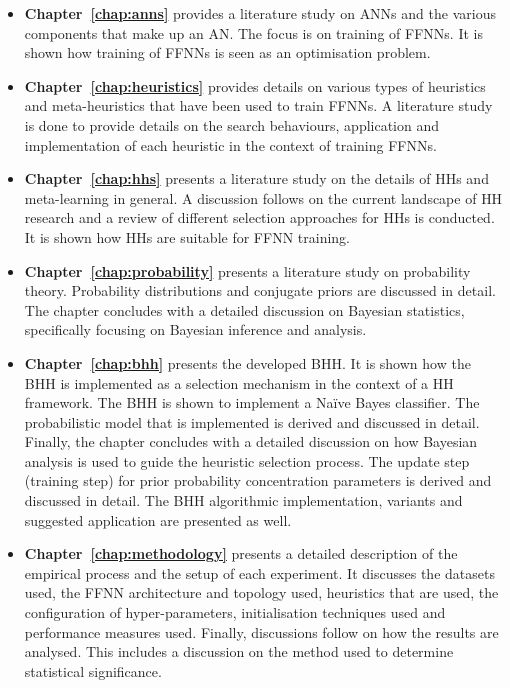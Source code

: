 \begin{itemize}
      \item \textbf{Chapter~\ref{chap:anns}} provides a literature study on \acp{ANN} and the various components that make up an \acf{AN}. The focus is on training of \acp{FFNN}. It is shown how training of \acp{FFNN} is seen as an optimisation problem.

      \item \textbf{Chapter~\ref{chap:heuristics}} provides details on various types of heuristics and meta-heuristics that have been used to train \acp{FFNN}. A literature study is done to provide details on the search behaviours, application and implementation of each heuristic in the context of training \acp{FFNN}.

      \item \textbf{Chapter~\ref{chap:hhs}} presents a literature study on the details of \acp{HH} and meta-learning in general. A discussion follows on the current landscape of \acs{HH} research and a review of different selection approaches for \acp{HH} is conducted. It is shown how \acp{HH} are suitable for \acs{FFNN} training.

      \item \textbf{Chapter~\ref{chap:probability}} presents a literature study on probability theory. Probability distributions and conjugate priors are discussed in detail. The chapter concludes with a detailed discussion on Bayesian statistics, specifically focusing on Bayesian inference and analysis.

      \item \textbf{Chapter~\ref{chap:bhh}} presents the developed \Acs{BHH}. It is shown how the \Acs{BHH} is implemented as a selection mechanism in the context of a \acs{HH} framework. The \Acs{BHH} is shown to implement a Na\"ive Bayes classifier. The probabilistic model that is implemented is derived and discussed in detail. Finally, the chapter concludes with a detailed discussion on how Bayesian analysis is used to guide the heuristic selection process. The update step (training step) for prior probability concentration parameters is derived and discussed in detail. The \Acs{BHH} algorithmic implementation, variants and suggested application are presented as well.

      \item \textbf{Chapter~\ref{chap:methodology}} presents a detailed description of the empirical process and the setup of each experiment. It discusses the datasets used, the \acs{FFNN} architecture and topology used, heuristics that are used, the configuration of hyper-parameters, initialisation techniques used and performance measures used.  Finally, discussions follow on how the results are analysed. This includes a discussion on the method used to determine statistical significance.


\end{itemize}
